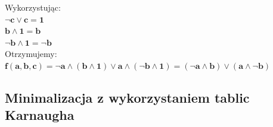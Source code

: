 \documentclass[12pt]{article}
\begin{document}
	\noindent Wykorzystując: \\
	
	\noindent $\mathbf{\neg c \vee c = 1}$ \\
	\noindent $\mathbf{b \wedge 1 = b}$ \\
	\noindent $\mathbf{\neg b \wedge 1 = \neg b}$ \\

	\noindent Otrzymujemy: \\

	\noindent $\mathbf{f(a, b, c) = \neg a \wedge (b \wedge 1) \vee a \wedge ( \neg b \wedge 1) = (\neg a \wedge b) \vee (a \wedge \neg b)}$

	\newpage

	\subsection{Minimalizacja z wykorzystaniem tablic Karnaugha}
\end{document}
